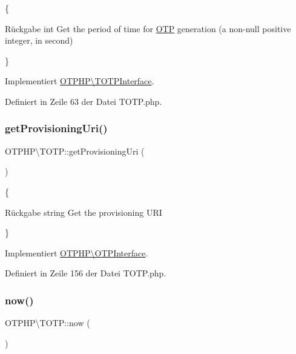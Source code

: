 \{\begin{DoxyReturn}{Rückgabe}
int Get the period of time for \mbox{\hyperlink{class_o_t_p_h_p_1_1_o_t_p}{O\+TP}} generation (a non-\/null positive integer, in second)
\end{DoxyReturn}
\} 

Implementiert \mbox{\hyperlink{interface_o_t_p_h_p_1_1_t_o_t_p_interface_a732f73c39b32e6caa9d327d82e8f8303}{O\+T\+P\+H\+P\textbackslash{}\+T\+O\+T\+P\+Interface}}.



Definiert in Zeile 63 der Datei T\+O\+T\+P.\+php.

\mbox{\label{class_o_t_p_h_p_1_1_t_o_t_p_a85b294664fda16d6b87d80e645714ed0}} 
\subsubsection{\texorpdfstring{get\+Provisioning\+Uri()}{getProvisioningUri()}}
{\footnotesize\ttfamily O\+T\+P\+H\+P\textbackslash{}\+T\+O\+T\+P\+::get\+Provisioning\+Uri (\begin{DoxyParamCaption}{ }\end{DoxyParamCaption})}

\{\begin{DoxyReturn}{Rückgabe}
string Get the provisioning U\+RI
\end{DoxyReturn}
\} 

Implementiert \mbox{\hyperlink{interface_o_t_p_h_p_1_1_o_t_p_interface_a6e8f0a0c2f1c3ec16426a80fc9610089}{O\+T\+P\+H\+P\textbackslash{}\+O\+T\+P\+Interface}}.



Definiert in Zeile 156 der Datei T\+O\+T\+P.\+php.

\mbox{\label{class_o_t_p_h_p_1_1_t_o_t_p_ab07cbc06fbc17b68852cdf722f40e58e}} 
\subsubsection{\texorpdfstring{now()}{now()}}
{\footnotesize\ttfamily O\+T\+P\+H\+P\textbackslash{}\+T\+O\+T\+P\+::now (\begin{DoxyParamCaption}{ }\end{DoxyParamCaption})}

